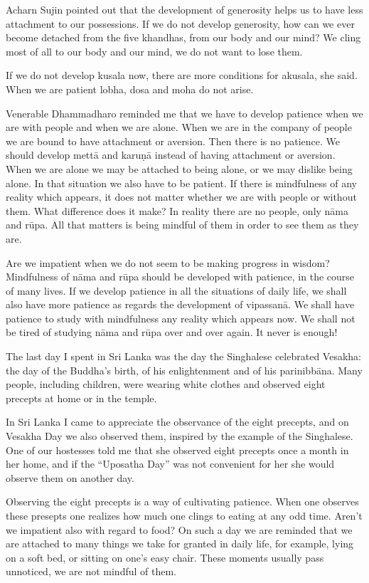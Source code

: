 Acharn Sujin pointed out that the development of generosity helps us to
have less attachment to our possessions. If we do not develop
generosity, how can we ever become detached from the five khandhas, from
our body and our mind? We cling most of all to our body and our mind, we
do not want to lose them.

If we do not develop kusala now, there are more conditions for akusala,
she said. When we are patient lobha, dosa and moha do not arise.

Venerable Dhammadharo reminded me that we have to develop patience when
we are with people and when we are alone. When we are in the company of
people we are bound to have attachment or aversion. Then there is no
patience. We should develop mettā and karuṇā instead of having
attachment or aversion. When we are alone we may be attached to being
alone, or we may dislike being alone. In that situation we also have to
be patient. If there is mindfulness of any reality which appears, it
does not matter whether we are with people or without them. What
difference does it make? In reality there are no people, only nāma and
rūpa. All that matters is being mindful of them in order to see them as
they are.

Are we impatient when we do not seem to be making progress in wisdom?
Mindfulness of nāma and rūpa should be developed with patience, in the
course of many lives. If we develop patience in all the situations of
daily life, we shall also have more patience as regards the development
of vipassanā. We shall have patience to study with mindfulness any
reality which appears now. We shall not be tired of studying nāma and
rūpa over and over again. It never is enough!

The last day I spent in Sri Lanka was the day the Singhalese celebrated
Vesakha: the day of the Buddha's birth, of his enlightenment and of his
parinibbāna. Many people, including children, were wearing white clothes
and observed eight precepts at home or in the temple.

In Sri Lanka I came to appreciate the observance of the eight precepts,
and on Vesakha Day we also observed them, inspired by the example of the
Singhalese. One of our hostesses told me that she observed eight
precepts once a month in her home, and if the ``Uposatha Day'' was not
convenient for her she would observe them on another day.

Observing the eight precepts is a way of cultivating patience. When one
observes these presepts one realizes how much one clings to eating at
any odd time. Aren't we impatient also with regard to food? On such a
day we are reminded that we are attached to many things we take for
granted in daily life, for example, lying on a soft bed, or sitting on
one's easy chair. These moments usually pass unnoticed, we are not
mindful of them.

